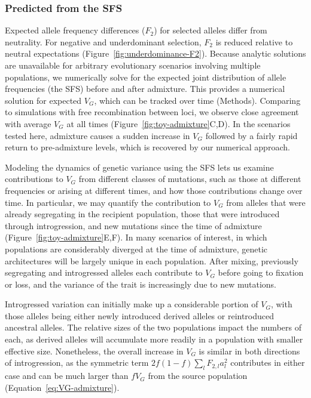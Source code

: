 \documentclass[10pt,letterpaper]{article}
\begin{document}
\subsubsection*{Predicted  from the SFS}

Expected allele frequency differences ($F_2$) for selected alleles differ from
neutrality. For negative and underdominant selection, $F_2$ is reduced relative
to neutral expectations (Figure~\ref{fig:underdominance-F2}). Because analytic
solutions are unavailable for arbitrary evolutionary scenarios involving
multiple populations, we numerically solve for the expected joint distribution
of allele frequencies (the SFS) before and after admixture. This provides a
numerical solution for expected $V_G$, which can be tracked over time
(Methods). Comparing to simulations with free recombination between loci, we
observe close agreement with average $V_G$ at all times
(Figure~\ref{fig:toy-admixture}C,D). In the scenarios tested here, admixture
causes a sudden increase in $V_G$ followed by a fairly rapid return to
pre-admixture levels, which is recovered by our numerical approach.

Modeling the dynamics of genetic variance using the SFS lets us examine
contributions to $V_G$ from different classes of mutations, such as those at
different frequencies or arising at different times, and how those
contributions change over time. In particular, we may quantify the contribution
to $V_G$ from alleles that were already segregating in the recipient
population, those that were introduced through introgression, and new mutations
since the time of admixture (Figure~\ref{fig:toy-admixture}E,F). In many
scenarios of interest, in which populations are considerably diverged at the
time of admixture, genetic architectures will be largely unique in each
population. After mixing, previously segregating and introgressed alleles each
contribute to $V_G$ before going to fixation or loss, and the variance of the
trait is increasingly due to new mutations. 

Introgressed variation can initially make up a considerable portion of $V_G$,
with those alleles being either newly introduced derived alleles or
reintroduced ancestral alleles. The relative sizes of the two populations
impact the numbers of each, as derived alleles will accumulate more readily in
a population with smaller effective size. Nonetheless, the overall increase in
$V_G$ is similar in both directions of introgression, as the symmetric term
\(2f(1-f)\sum_l F_{2,l} a_l^2\) contributes in either case and can be much
larger than $f V_G$ from the source population
(Equation~\ref{eq:VG-admixture}).
\end{document}
